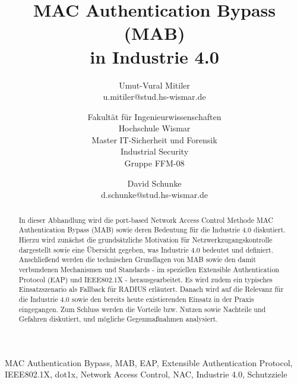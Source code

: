 \documentclass[conference]{IEEEtran}
\begin{document}
\title{MAC Authentication Bypass (MAB)\\ in Industrie 4.0}
\author{
	Umut-Vural Mitiler\\
	u.mitiler@stud.hs-wismar.de
	\and
	Fakultät für Ingenieurwissenschaften\\
	Hochschule Wismar\\
	Master IT-Sicherheit und Forensik\\
	Industrial Security\\
	Gruppe FFM-08
	\and
	David Schunke\\
	d.schunke@stud.hs-wismar.de
}

\maketitle

\thispagestyle{plain}
\pagestyle{plain}

%


%

\begin{abstract}
In dieser Abhandlung wird die port-based Network Access Control Methode MAC Authentication Bypass (MAB) sowie deren Bedeutung für die Industrie 4.0 diskutiert. Hierzu wird zunächst die grundsätzliche Motivation für Netzwerkzugangskontrolle dargestellt sowie eine Übersicht gegeben, was Industrie 4.0 bedeutet und definiert. Anschließend werden die technischen Grundlagen von MAB sowie den damit verbundenen Mechanismen und Standards - im speziellen Extensible Authentication Protocol (EAP) und IEEE802.1X - herausgearbeitet. Es wird zudem ein typisches Einsatzszenario als Fallback für RADIUS erläutert. Danach wird auf die Relevanz für die Industrie 4.0 sowie den bereits heute existierenden Einsatz in der Praxis eingegangen. Zum Schluss werden die Vorteile bzw. Nutzen sowie Nachteile und Gefahren diskutiert, und mögliche Gegenmaßnahmen analysiert. 
\end{abstract}

\vspace{1em}

\begin{IEEEkeywords}
MAC Authentication Bypass, MAB, EAP, Extensible Authentication Protocol, IEEE802.1X, dot1x, Network Access Control, NAC, Industrie 4.0, Schutzziele
\end{IEEEkeywords}
\end{document}
